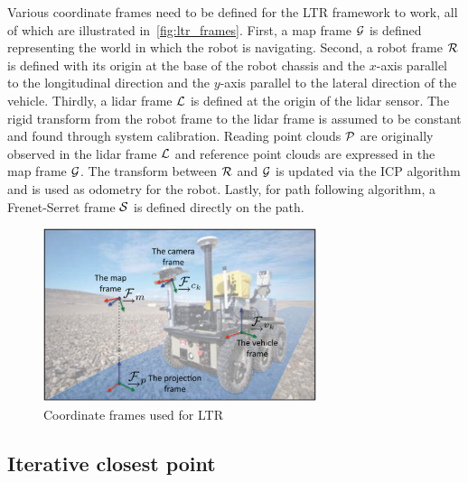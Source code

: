 Various coordinate frames need to be defined for the \ac{LTR} framework to work, all of which are illustrated in~\autoref{fig:ltr_frames}.
First, a map frame $\mathcal{G}$ is defined representing the world in which the robot is navigating.
Second, a robot frame $\mathcal{R}$ is defined with its origin at the base of the robot chassis and the $x$-axis parallel to the longitudinal direction and the $y$-axis parallel to the lateral direction of the vehicle.
Thirdly, a lidar frame $\mathcal{L}$ is defined at the origin of the lidar sensor. 
The rigid transform from the robot frame to the lidar frame \transform{\robotf}{\lidarf} is assumed to be constant and found through system calibration.
Reading point clouds $\mathcal{P}$ are originally observed in the lidar frame $\mathcal{L}$ and reference point clouds are expressed in the map frame $\mathcal{G}$.
The transform between $\mathcal{R}$ and $\mathcal{G}$ \transform{\robotf}{\mapf} is updated via the \ac{ICP} algorithm and is used as odometry for the robot.
Lastly, for path following algorithm, a Frenet-Serret frame $\mathcal{S}$ is defined directly on the path.

\begin{figure} [htpb]
	\centering
	\includegraphics[height=2.0in]{figs/warthog_frames.pdf}
	\caption{Coordinate frames used for \ac{LTR}}
	\label{fig:ltr_frames}
\end{figure}

\subsection{Iterative closest point}
\label{ICP}

